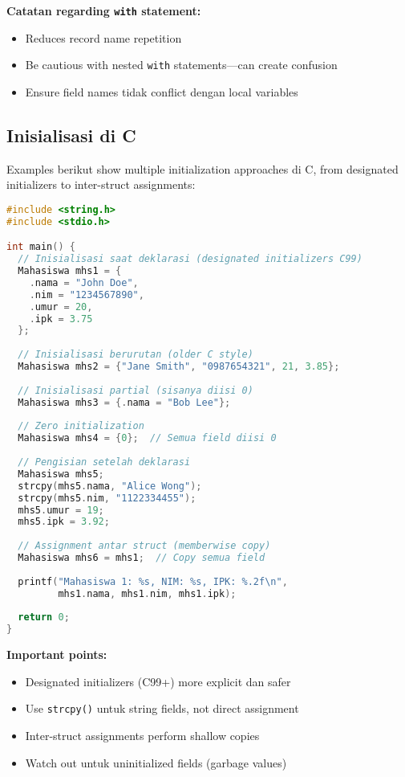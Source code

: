 \documentclass[../main.tex]{subfiles}
\begin{document}
\textbf{Catatan regarding \texttt{with} statement:}
\begin{itemize}
  \item Reduces record name repetition
  \item Be cautious with nested \texttt{with} statements—can create confusion
  \item Ensure field names tidak conflict dengan local variables
\end{itemize}

\subsection{Inisialisasi di C}

Examples berikut show multiple initialization approaches di C, from designated initializers to inter-struct assignments:

\begin{lstlisting}[language=C, caption={Inisialisasi struct di C}]
#include <string.h>
#include <stdio.h>

int main() {
  // Inisialisasi saat deklarasi (designated initializers C99)
  Mahasiswa mhs1 = {
    .nama = "John Doe",
    .nim = "1234567890",
    .umur = 20,
    .ipk = 3.75
  };
  
  // Inisialisasi berurutan (older C style)
  Mahasiswa mhs2 = {"Jane Smith", "0987654321", 21, 3.85};
  
  // Inisialisasi partial (sisanya diisi 0)
  Mahasiswa mhs3 = {.nama = "Bob Lee"};
  
  // Zero initialization
  Mahasiswa mhs4 = {0};  // Semua field diisi 0
  
  // Pengisian setelah deklarasi
  Mahasiswa mhs5;
  strcpy(mhs5.nama, "Alice Wong");
  strcpy(mhs5.nim, "1122334455");
  mhs5.umur = 19;
  mhs5.ipk = 3.92;
  
  // Assignment antar struct (memberwise copy)
  Mahasiswa mhs6 = mhs1;  // Copy semua field
  
  printf("Mahasiswa 1: %s, NIM: %s, IPK: %.2f\n", 
         mhs1.nama, mhs1.nim, mhs1.ipk);
  
  return 0;
}
\end{lstlisting}

\textbf{Important points:}
\begin{itemize}
  \item Designated initializers (C99+) more explicit dan safer
  \item Use \texttt{strcpy()} untuk string fields, not direct assignment
  \item Inter-struct assignments perform shallow copies
  \item Watch out untuk uninitialized fields (garbage values)
\end{itemize}
\end{document}
